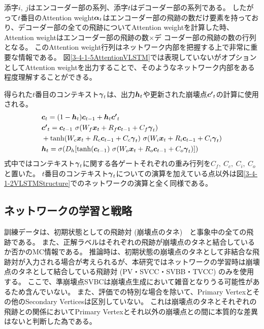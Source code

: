 添字$i,\ j$はエンコーダー部の系列、添字$t$はデコーダー部の系列である。
したがって$t$番目のAttention weight${\mbox{\boldmath{$\alpha$}}}_{t}$はエンコーダー部の飛跡の数だけ要素を持っており、デコーダー部の全ての飛跡についてAttention weightを計算した時、Attention weightはエンコーダー部の飛跡の数$\times$デ
コーダー部の飛跡の数の行列となる。
このAttention weight行列はネットワーク内部を把握する上で非常に重要な情報である。
図\ref{3-4-1-5AttentionVLSTM}では表現していないがオプションとしてAttention weightを出力することで、そのようなネットワーク内部をある程度理解することができる。

得られた$t$番目のコンテキスト${\mbox{\boldmath{$\gamma$}}}_{t}$は、出力${\mbox{\boldmath{$h$}}}_{t}$や更新された崩壊点${\mbox{\boldmath{$c'$}}}_{t}$の計算に使用される。
\begin{equation}
 \begin{split}
  &{\mbox{\boldmath{$c$}}}_{t} 
  = (1-{\mbox{\boldmath{$h$}}}_t) {\mbox{\boldmath{$c$}}}_{t-1} + {\mbox{\boldmath{$h$}}}_t {\mbox{\boldmath{$c'$}}}_{t}\\
  &{\mbox{\boldmath{$c'$}}}_{t}
  = {\mbox{\boldmath{$c$}}}_{t-1} \  \sigma (W_f {\mbox{\boldmath{$x$}}}_t + R_f {\mbox{\boldmath{$c$}}}_{t-1} + C_f {\mbox{\boldmath{$\gamma$}}}_{t})\\
  &+ \tanh (W_c {\mbox{\boldmath{$x$}}}_t + R_c {\mbox{\boldmath{$c$}}}_{t-1} + C_c {\mbox{\boldmath{$\gamma$}}}_{t}) \  \sigma (W_i {\mbox{\boldmath{$x$}}}_t + R_i {\mbox{\boldmath{$c$}}}_{t-1} + C_i {\mbox{\boldmath{$\gamma$}}}_{t})\\
  &{\mbox{\boldmath{$h$}}}_{t} 
  = \sigma (D_h [\tanh({\mbox{\boldmath{$c$}}}_{t-1}) \  \sigma (W_o {\mbox{\boldmath{$x$}}}_t + R_o {\mbox{\boldmath{$c$}}}_{t-1} + C_o {\mbox{\boldmath{$\gamma$}}}_{t}) ])
 \end{split}
\end{equation}
式中ではコンテキスト${\mbox{\boldmath{$\gamma$}}}_{t}$に関する各ゲートそれぞれの重み行列を$C_f,\ C_c,\ C_i,\ C_o$と置いた。
$t$番目のコンテキスト${\mbox{\boldmath{$\gamma$}}}_{t}$についての演算を加えている点以外は図\ref{3-4-1-2VLSTMStructure}でのネットワークの演算と全く同様である。


\subsection{ネットワークの学習と戦略} \label{Net:VLSTM:TrainingandStrategyofVLSTM}

訓練データは、初期状態としての飛跡対 (崩壊点のタネ)　と事象中の全ての飛跡である。
また、正解ラベルはそれぞれの飛跡が崩壊点のタネと結合しているか否かのMC情報である。
推論時は、初期状態の崩壊点のタネとして非結合な飛跡対が入力される場合が考えられるが、本研究ではネットワークの学習時は崩壊点のタネとして結合している飛跡対 (PV・SVCC・SVBB・TVCC) のみを使用する。
ここで、準崩壊点SVBCは崩壊点生成において雑音となりうる可能性があるため含んでいない。
また、評価での特別な場合を除いて、Primary Vertexとその他のSecondary Verticesは区別していない。
これは崩壊点のタネとそれぞれの飛跡との関係においてPrimary Vertexとそれ以外の崩壊点との間に本質的な差異はないと判断した為である。

